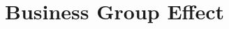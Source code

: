\documentclass{beamer}
\begin{document}
	
	
	
	
	
	
	
	
	
	
	
	
	
	
	\section{Business Group Effect}
%
%		





	
	
\end{document}
